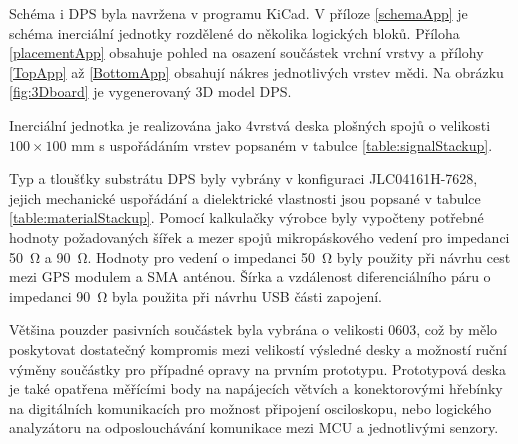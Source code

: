 Schéma i \ac{DPS} byla navržena v programu KiCad. V příloze \ref{schemaApp} je schéma inerciální jednotky rozdělené do několika logických bloků. Příloha \ref{placementApp} obsahuje pohled na osazení součástek vrchní vrstvy a přílohy \ref{TopApp} až \ref{BottomApp} obsahují nákres jednotlivých vrstev mědi. Na obrázku \ref{fig:3Dboard} je vygenerovaný 3D model \ac{DPS}.

Inerciální jednotka je realizována jako 4vrstvá deska plošných spojů o velikosti $ 100 \times 100 $ mm s uspořádáním vrstev popsaném v tabulce \ref{table:signalStackup}.


Typ a tloušťky substrátu \ac{DPS} byly vybrány v konfiguraci JLC04161H-7628, jejich mechanické uspořádání a dielektrické vlastnosti jsou popsané v tabulce \ref{table:materialStackup}. Pomocí kalkulačky výrobce byly vypočteny potřebné hodnoty požadovaných šířek a mezer spojů mikropáskového vedení pro impedanci \SI{50}{\ohm} a \SI{90}{\ohm}. Hodnoty pro vedení o impedanci \SI{50}{\ohm} byly použity při návrhu cest mezi \ac{GPS} modulem a \ac{SMA} anténou. Šírka a vzdálenost diferenciálního páru o impedanci \SI{90}{\ohm} byla použita při návrhu \ac{USB} části zapojení.


Většina pouzder pasivních součástek byla vybrána o velikosti 0603, což by mělo poskytovat dostatečný kompromis mezi velikostí výsledné desky a možností ruční výměny součástky pro případné opravy na prvním prototypu. Prototypová deska je také opatřena měřícími body na napájecích větvích a konektorovými hřebínky na digitálních komunikacích pro možnost připojení osciloskopu, nebo logického analyzátoru na odposlouchávání komunikace mezi \ac{MCU} a jednotlivými senzory. 



